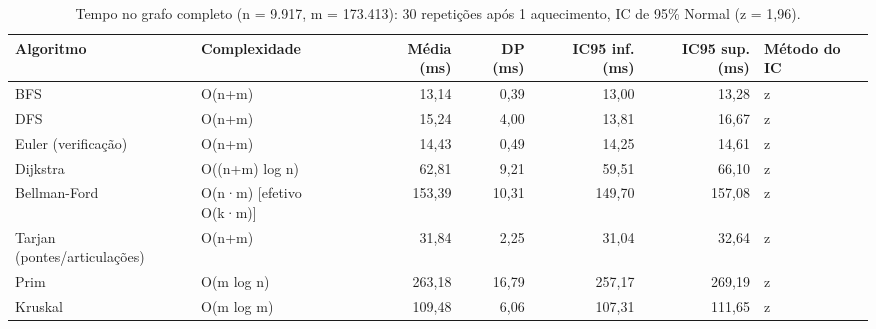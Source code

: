 \begin{table}[!htb]
\centering
\caption{Tempo no grafo completo (n = 9.917, m = 173.413): 30 repetições após 1 aquecimento, IC de 95\% Normal (z = 1,96).}
\label{tab:tempos}
\begin{adjustbox}{max width=\linewidth}
\begin{tabular}{llrrrrl}
\toprule
Algoritmo & Complexidade & Média (ms) & DP (ms) & IC95 inf. (ms) & IC95 sup. (ms) & Método do IC \\
\midrule
BFS & O(n+m) & 13,14 & 0,39 & 13,00 & 13,28 & z \\
DFS & O(n+m) & 15,24 & 4,00 & 13,81 & 16,67 & z \\
Euler (verificação) & O(n+m) & 14,43 & 0,49 & 14,25 & 14,61 & z \\
Dijkstra & O((n+m) log n) & 62,81 & 9,21 & 59,51 & 66,10 & z \\
Bellman-Ford & O(n·m) [efetivo O(k·m)] & 153,39 & 10,31 & 149,70 & 157,08 & z \\
Tarjan (pontes/articulações) & O(n+m) & 31,84 & 2,25 & 31,04 & 32,64 & z \\
Prim & O(m log n) & 263,18 & 16,79 & 257,17 & 269,19 & z \\
Kruskal & O(m log m) & 109,48 & 6,06 & 107,31 & 111,65 & z \\
\bottomrule
\end{tabular}
\end{adjustbox}
\end{table}
